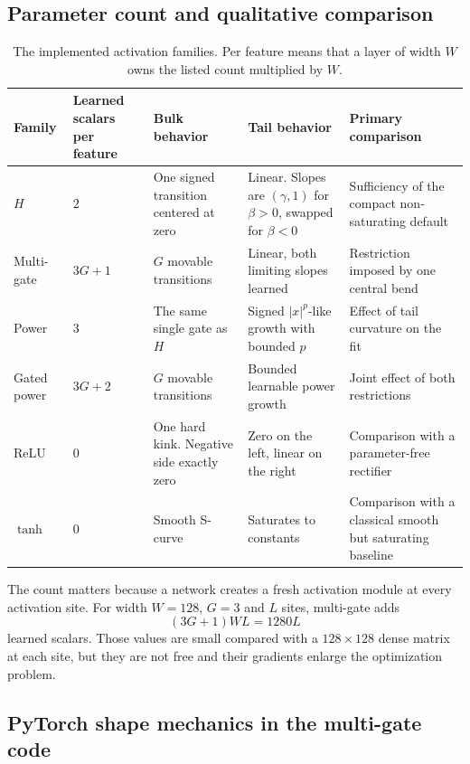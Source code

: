 \documentclass[10pt,aps,prd,twocolumn,nofootinbib]{revtex4-2}
\begin{document}
\subsection{Parameter count and qualitative comparison}

\begin{table}[t]
\centering
\begin{tabular}{p{}p{}p{}
                p{}p{}}
\toprule
Family & Learned scalars per feature & Bulk behavior & Tail behavior &
Primary comparison \\
\midrule
\(H\) & \(2\) & One signed transition centered at zero & Linear.  Slopes are
$(\gamma,1)$ for $\beta>0$, swapped for $\beta<0$ & Sufficiency of the compact
non-saturating default \\
Multi-gate & \(3G+1\) & \(G\) movable transitions & Linear, both limiting
slopes learned & Restriction imposed by one central bend \\
Power & \(3\) & The same single gate as \(H\) & Signed
\(|x|^p\)-like growth with bounded \(p\) & Effect of tail curvature on the fit \\
Gated power & \(3G+2\) & \(G\) movable transitions & Bounded learnable power
growth & Joint effect of both restrictions \\
ReLU & \(0\) & One hard kink.  Negative side exactly zero & Zero on the left,
linear on the right & Comparison with a parameter-free rectifier \\
\(\tanh\) & \(0\) & Smooth S-curve & Saturates to constants & Comparison with
a classical smooth but saturating baseline \\
\bottomrule
\end{tabular}
\caption{The implemented activation families.  Per feature means that a layer
of width \(W\) owns the listed count multiplied by \(W\).}
\label{tab:activation-compare}
\end{table}

The count matters because a network creates a fresh activation module at
every activation site.  For width \(W=128\), \(G=3\) and \(L\) sites,
multi-gate adds
\begin{equation*}
  (3G+1)WL=1280L
\end{equation*}
learned scalars.  Those values are small compared with a
\(128\times128\) dense matrix at each site, but they are not free and their
gradients enlarge the optimization problem.

\subsection{PyTorch shape mechanics in the multi-gate code}
\end{document}
